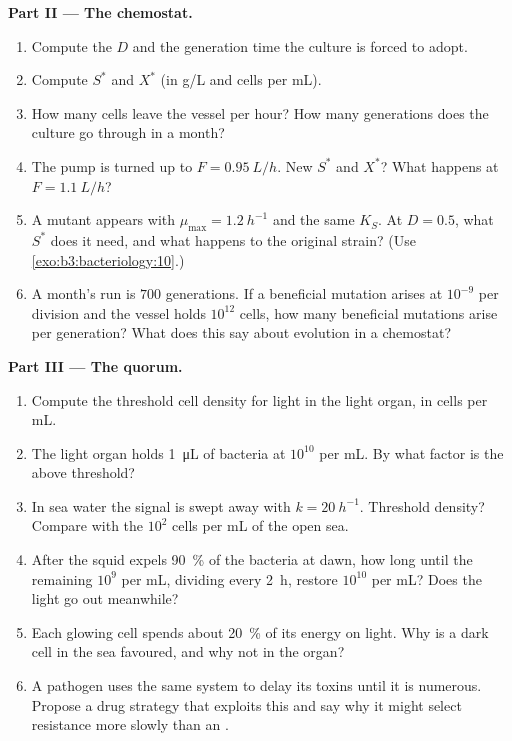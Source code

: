 \begin{problem}
\medskip
\noindent\textbf{Part II --- The chemostat.}
\begin{enumerate}[resume]
  \item Compute the  $D$ and the generation time the
        culture is forced to adopt.
  \item Compute $S^{*}$ and $X^{*}$ (in g/L and cells per mL).
  \item How many cells leave the vessel per hour? How many generations
        does the culture go through in a month?
  \item The pump is turned up to $F = \qty{0.95}{L/h}$. New $S^{*}$ and
        $X^{*}$? What happens at $F = \qty{1.1}{L/h}$?
  \item A mutant appears with $\mu_{\max} = \qty{1.2}{h^{-1}}$ and the
        same $K_{S}$. At $D = 0.5$, what $S^{*}$ does it need, and what
        happens to the original strain? (Use
        \cref{exo:b3:bacteriology:10}.)
  \item A month's run is $700$ generations. If a beneficial mutation
        arises at $10^{-9}$ per division and the vessel holds $10^{12}$
        cells, how many beneficial mutations arise per generation?
        What does this say about evolution in a chemostat?
\end{enumerate}

\medskip
\noindent\textbf{Part III --- The quorum.}
\begin{enumerate}[resume]
  \item Compute the threshold cell density for light in the light
        organ, in cells per mL.
  \item The light organ holds \qty{1}{\micro L} of bacteria at $10^{10}$
        per mL. By what factor is the  above threshold?
  \item In sea water the signal is swept away with $k = \qty{20}{h^{-1}}$.
        Threshold density? Compare with the $10^{2}$ cells per mL of
        the open sea.
  \item After the squid expels \qty{90}{\%} of the bacteria at dawn,
        how long until the remaining $10^{9}$ per mL, dividing every
        \qty{2}{h}, restore $10^{10}$ per mL? Does the light go out
        meanwhile?
  \item Each glowing cell spends about \qty{20}{\%} of its energy on
        light. Why is a dark cell in the sea favoured, and why not in
        the organ?
  \item A pathogen uses the same system to delay its toxins until it
        is numerous. Propose a drug strategy that exploits this and say
        why it might select resistance more slowly than an .
\end{enumerate}


\end{problem}
